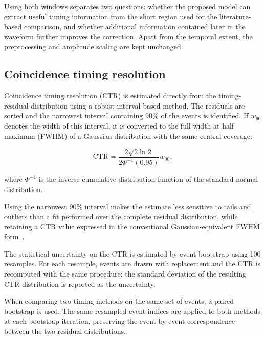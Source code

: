 Using both windows separates two questions: whether the proposed model can extract useful timing information from the short region used for the literature-based comparison, and whether additional information contained later in the waveform further improves the correction. Apart from the temporal extent, the preprocessing and amplitude scaling are kept unchanged.





\subsection{Coincidence timing resolution}

Coincidence timing resolution (CTR) is estimated directly from the timing-residual distribution using a robust interval-based method. 
The residuals are sorted and the narrowest interval containing \(90\%\) of the events is identified. 
If \(w_{90}\) denotes the width of this interval, it is converted to the full width at half maximum (FWHM) of a Gaussian distribution 
with the same central coverage:

\begin{equation}
\mathrm{CTR}
=
\frac{2\sqrt{2\ln 2}}
{2\Phi^{-1}(0.95)}
w_{90},
\end{equation}

where \(\Phi^{-1}\) is the inverse cumulative distribution function of the standard normal distribution.

Using the narrowest \(90\%\) interval makes the estimate less sensitive to tails and outliers than a fit performed over the complete residual 
distribution, while retaining a CTR value expressed in the conventional Gaussian-equivalent FWHM form~\cite{atkinson2025}.

The statistical uncertainty on the CTR is estimated by event bootstrap using 100 resamples. 
For each resample, events are drawn with replacement and the CTR is recomputed with the same procedure; 
the standard deviation of the resulting CTR distribution is reported as the uncertainty.

When comparing two timing methods on the same set of events, a paired bootstrap is used. 
The same resampled event indices are applied to both methods at each bootstrap iteration, 
preserving the event-by-event correspondence between the two residual distributions. 
